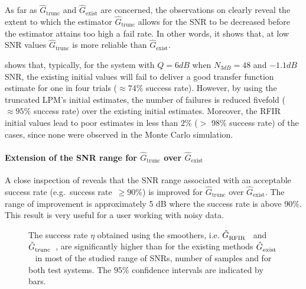 As far as $\hat G_\mathrm{trunc}$ and $\hat G_\mathrm{exist}$ are concerned, the observations on  clearly reveal the extent to which the estimator $\hat G_\mathrm{trunc}$ allows for the SNR to be decreased before the estimator attains too high a fail rate. 
In other words, it shows that, at low SNR values $\hat G_\mathrm{trunc}$ is more reliable than $\hat G_\mathrm{exist}$. 

   shows that, typically, for the system with $Q=6\unit{dB}$ when $N_{3\unit{dB}}=48$ and $-1.1 \unit{dB}$ \gls{SNR}, the existing initial values will fail to deliver a good transfer function estimate for one in four trials ($\approx 74\%$ success rate).
However, by using the truncated \gls{LPM}'s initial estimates, the number of failures is reduced fivefold ($\approx 95\%$ success rate) over the existing initial estimates.
Moreover, the \gls{RFIR} initial values lead to poor estimates in less than $2\%$ ($>$ $98\%$ success rate) of the cases, since none were observed in the Monte Carlo simulation.

\paragraph*{Extension of the SNR range for $\hat G_\mathrm{trunc}$ over $\hat G_\mathrm{exist}$}
A close inspection of  reveals that the \gls{SNR} range associated with an acceptable success rate (e.g.\ success rate~$\geqslant 90\%$) is improved for $\hat G_\mathrm{trunc}$ over $\hat G_\mathrm{exist}$. The range of improvement is approximately 5 dB where the success rate is above $90\%$. This result is very useful for a user working with noisy data.

\begin{figure}
  \centering
  \setlength{\figurewidth}{0.85\onecolumnwidth}
  \setlength{\figureheight}{0.68\figurewidth}
  
 \caption[Simulated success rate of the different initialization schemes for varying \gls{SNR}.]{The success rate $\eta$  obtained using the smoothers, i.e. $\hat{G}_{\mathrm{RFIR}}^{\mathrm{}}$~ and $\hat{G}_{\mathrm{trunc}}^{\mathrm{}}$~, are significantly higher than for the existing methods $\hat{G}_{\mathrm{exist}}^{\mathrm{}}$~ in most of the studied range of \glspl{SNR}, number of samples and for both test systems. The $95\%$ confidence intervals are indicated by bars.}
  \label{fig:successRateVS_SNR36N3dB}
\end{figure}

